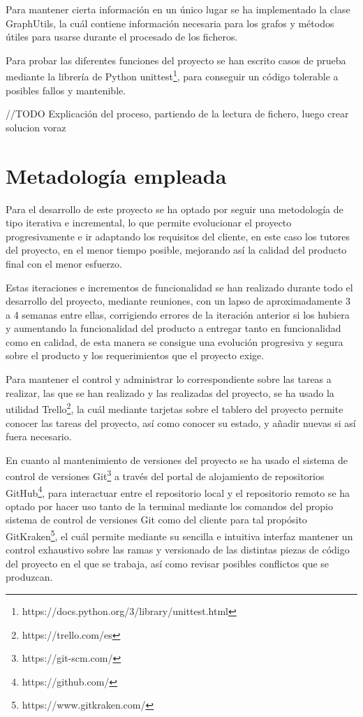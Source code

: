 Para mantener cierta información en un único lugar se ha implementado la clase GraphUtils, la cuál contiene información necesaria para los grafos y métodos útiles para usarse durante el procesado de los ficheros.

Para probar las diferentes funciones del proyecto se han escrito casos de prueba mediante la librería de Python unittest\footnote{https://docs.python.org/3/library/unittest.html}, para conseguir un código tolerable a posibles fallos y mantenible.

//TODO Explicación del proceso, partiendo de la lectura de fichero, luego crear solucion voraz


\section{Metadología empleada}
Para el desarrollo de este proyecto se ha optado por seguir una metodología de tipo iterativa e incremental, lo que permite evolucionar el proyecto progresivamente e ir adaptando los requisitos del cliente, en este caso los tutores del proyecto, en el menor tiempo posible, mejorando así la calidad del producto final con el menor esfuerzo.

Estas iteraciones e incrementos de funcionalidad se han realizado durante todo el desarrollo del proyecto, mediante reuniones, con un lapso de aproximadamente 3 a 4 semanas entre ellas, corrigiendo errores de la iteración anterior si los hubiera y aumentando la funcionalidad del producto a entregar tanto en funcionalidad como en calidad, de esta manera se consigue una evolución progresiva y segura sobre el producto y los requerimientos que el proyecto exige.

Para mantener el control y administrar lo correspondiente sobre las tareas a realizar, las que se han realizado y las realizadas del proyecto, se ha usado la utilidad Trello\footnote{https://trello.com/es}, la cuál mediante tarjetas sobre el tablero del proyecto permite conocer las tareas del proyecto, así como conocer su estado, y añadir nuevas si así fuera necesario.

En cuanto al mantenimiento de versiones del proyecto se ha usado el sistema de control de versiones Git\footnote{https://git-scm.com/} a través del portal de alojamiento de repositorios GitHub\footnote{https://github.com/}, para interactuar entre el repositorio local y el repositorio remoto se ha optado por hacer uso tanto de la terminal mediante los comandos del propio sistema de control de versiones Git como del cliente para tal propósito GitKraken\footnote{https://www.gitkraken.com/}, el cuál permite mediante su sencilla e intuitiva interfaz mantener un control exhaustivo sobre las ramas y versionado de las distintas piezas de código del proyecto en el que se trabaja, así como revisar posibles conflictos que se produzcan.

